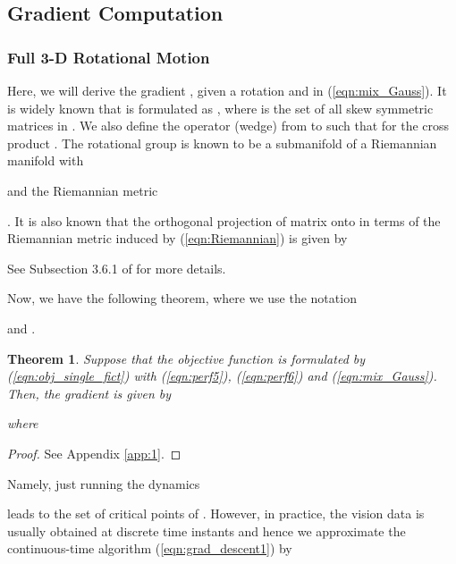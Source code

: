 \documentclass[conference,letterpaper]{ieeeconf}
\newtheorem{theorem}{Theorem}
\begin{document}
\subsection{Gradient Computation}



\subsubsection*{Full 3-D Rotational Motion}



Here, we will derive the gradient , given a rotation  and  in (\ref{eqn:mix_Gauss}).
It is widely known that  is formulated as
,
where  is the set of all skew symmetric matrices in .
We also define the operator (wedge) from  to 
such that  for the cross product .
The rotational group  is known to be a submanifold of
a Riemannian manifold  with 

and the Riemannian metric 

\cite{AMS_BK}.
It is also known that
the orthogonal projection  of matrix
 onto  
in terms of the Riemannian metric induced by (\ref{eqn:Riemannian})
is given by

See Subsection 3.6.1 of \cite{AMS_BK} for more details.











Now, we have the following theorem, where we use the notation

and .



\begin{theorem}
Suppose that the objective function  is formulated by (\ref{eqn:obj_single_fict})
with (\ref{eqn:perf5}), (\ref{eqn:perf6}) and (\ref{eqn:mix_Gauss}).
Then, the gradient  
is given by 

where

\end{theorem}


\begin{proof}
See Appendix \ref{app:1}.
\end{proof}



Namely, just running the dynamics 

leads  to the set of critical points of .
However, in practice, 
the vision data is usually obtained at discrete time instants
and hence 
we approximate the continuous-time algorithm (\ref{eqn:grad_descent1}) by
\end{document}
